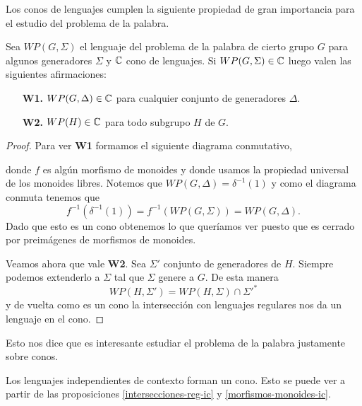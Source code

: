 \documentclass[tesis.tex]{subfiles}
\begin{document}
Los conos de lenguajes cumplen la siguiente propiedad de gran importancia para el estudio del problema de la palabra.
\medskip
\begin{prop}\label{prop-cono-wp}
	Sea $WP(G, \Sigma)$ el lenguaje del problema de la palabra de cierto grupo $G$ para algunos generadores $\Sigma$ y $\mathbb{C}$ cono de lenguajes. 
	Si $WP(G, \Sigma) \in \mathbb{C}$ luego valen las siguientes afirmaciones:
	\begin{itemize}
		\item[\textbf{W1.}] $WP(G, \Delta) \in \mathbb{C}$ para cualquier conjunto de generadores $\Delta$.
		\item[\textbf{W2.}] $WP(H) \in \mathbb{C}$ para todo subgrupo $H$ \fg de $G$.
	\end{itemize} 
\end{prop}
\begin{proof}
		Para ver \textbf{W1} formamos el siguiente diagrama conmutativo,
		\begin{center}
		\end{center}
		donde $f$ es algún morfismo de monoides y donde usamos la propiedad universal de los monoides libres.
		Notemos que $WP(G, \Delta) = \delta^{-1}(1)$ y como el diagrama conmuta tenemos que 
		\[
		f^{-1}(\delta^{-1}(1)) = f^{-1}(WP(G,\Sigma)) = WP(G, \Delta).
		\]
		Dado que esto es un cono obtenemos lo que queríamos ver puesto que es cerrado por preimágenes de morfismos de monoides.
		
		
		
		Veamos ahora que vale \textbf{W2}. 
		Sea $\Sigma'$ conjunto de generadores de $H$.
		Siempre podemos extenderlo a $\Sigma$ tal que $\Sigma$ genere a $G$. 
		De esta manera 
		\[
		WP(H, \Sigma') = WP(H, \Sigma) \cap \Sigma'^*
		\]
		y de vuelta como es un cono la intersección con lenguajes regulares nos da un lenguaje en el cono. 

\end{proof}


Esto nos dice que es interesante estudiar el problema de la palabra justamente sobre conos.


\begin{ej}\label{ic-cono}
	Los lenguajes independientes de contexto forman un cono.
	Esto se puede ver a partir de las proposiciones  \ref{intersecciones-reg-ic} y \ref{morfismos-monoides-ic}.
\end{ej}
\end{document}
